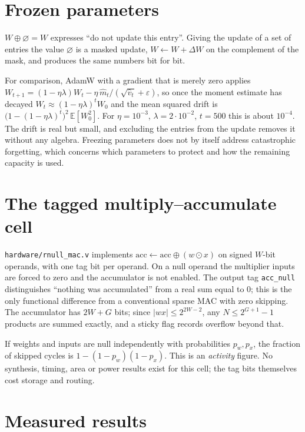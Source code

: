 \documentclass[11pt,a4paper]{article}
\theoremstyle{definition}
\theoremstyle{remark}
\newcommand{\nul}{\varnothing}
\newcommand{\op}{\oplus}
\newcommand{\od}{\odot}
\begin{document}
\section{Frozen parameters}

$W\op\nul=W$ expresses ``do not update this entry''. Giving the update of a
set of entries the value $\nul$ is a masked update,
$W\leftarrow W+\Delta W$ on the complement of the mask, and produces the same
numbers bit for bit.

For comparison, AdamW with a gradient that is merely zero applies
$W_{t+1}=(1-\eta\lambda)W_t-\eta\,\hat m_t/(\sqrt{\hat v_t}+\varepsilon)$, so
once the moment estimate has decayed
$W_t\approx(1-\eta\lambda)^tW_0$ and the mean squared drift is
$\bigl(1-(1-\eta\lambda)^t\bigr)^2\,\mathbb{E}[W_0^2]$. For $\eta=10^{-3}$,
$\lambda=2\cdot10^{-2}$, $t=500$ this is about $10^{-4}$. The drift is real but
small, and excluding the entries from the update removes it without any
algebra. Freezing parameters does not by itself address catastrophic
forgetting, which concerns which parameters to protect and how the remaining
capacity is used.

\section{The tagged multiply--accumulate cell}

\texttt{hardware/rnull\_mac.v} implements
$\mathrm{acc}\leftarrow\mathrm{acc}\op(w\od x)$ on signed $W$-bit operands, with
one tag bit per operand. On a null operand the multiplier inputs are forced to
zero and the accumulator is not enabled. The output tag \texttt{acc\_null}
distinguishes ``nothing was accumulated'' from a real sum equal to $0$; this is
the only functional difference from a conventional sparse MAC with zero
skipping. The accumulator has $2W+G$ bits; since $|wx|\leq2^{2W-2}$, any
$N\leq2^{G+1}-1$ products are summed exactly, and a sticky flag records
overflow beyond that.

If weights and inputs are null independently with probabilities $p_w,p_x$, the
fraction of skipped cycles is $1-(1-p_w)(1-p_x)$. This is an \emph{activity}
figure. No synthesis, timing, area or power results exist for this cell; the
tag bits themselves cost storage and routing.

\section{Measured results}\label{sec:evidence}
\end{document}
